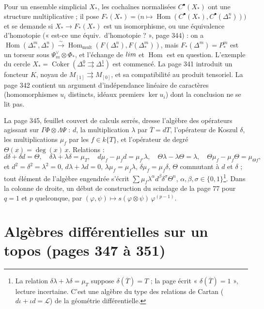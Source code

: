 \documentclass[11pt,a4paper]{article}
\begin{document}
Pour un ensemble simplicial $X_*$, les cochaînes normalisées $C^\bullet(X_*)$ ont
une structure multiplicative ; il pose $F_*(X_*) = \bigl(n \mapsto
\operatorname{Hom}(C^\bullet(X_*), C^\bullet(\Delta^n_*))\bigr)$ et se demande si
$X_* \to F_*(X_*)$ est un isomorphisme, ou une équivalence d'homotopie (« est-ce
une équiv.\ d'homotopie ? », page 344) : on a $\operatorname{Hom}(\Delta^m_*,
\Delta^n_*) \xrightarrow{\sim} \operatorname{Hom}_{\mathrm{mult}}(F(\Delta^n_*),
F(\Delta^m_*))$, mais $F_*(\Delta^m) = P^m_*$ est un torseur sous
$\Psi_m^\vee \otimes \Phi_*$, et l'échange de $\varprojlim$ et
$\operatorname{Hom}$ est en question. L'exemple du cercle $X_* =
\operatorname{Coker}(\Delta^0_* \rightrightarrows \Delta^1_*)$ est commencé. La
page 341 introduit un foncteur $K$, noyau de $M_{[1]} \rightrightarrows M_{[0]}$,
et sa compatibilité au produit tensoriel. La page 342 contient un argument
d'indépendance linéaire de caractères (homomorphismes $u_i$ distincts, idéaux
premiers $\ker u_i$) dont la conclusion ne se lit pas.

La page 345, feuillet couvert de calculs serrés, dresse l'algèbre des
opérateurs agissant sur $\Gamma\Phi \otimes \Lambda\Psi$ : $d$, la multiplication
$\lambda$ par $\overline{T} = dT$, l'opérateur de Koszul $\delta$, les
multiplications $\mu_f$ par les $f \in k\{T\}$, et l'opérateur de degré
$\Theta(x) = \deg(x)\,x$. Relations :
\[
d\delta + \delta d = \Theta, \quad \delta\lambda + \lambda\delta = \mu_T, \quad d\mu_f - \mu_fd = \mu_{f'}\lambda, \quad \Theta\lambda - \lambda\Theta = \lambda, \quad \Theta\mu_f - \mu_f\Theta = \mu_{\Theta f} ,
\]
et $d^2 = \delta^2 = \lambda^2 = 0$, $d\lambda + \lambda d = 0$, $\lambda\mu_f =
\mu_f\lambda$, $\delta\mu_f = \mu_f\delta$, $\Theta$ commutant à $d$ et
$\delta$ ; tout élément de l'algèbre engendrée s'écrit $\sum \mu_f
\lambda^\alpha d^\beta \delta^\sigma \Theta^n$, $\alpha, \beta, \sigma \in
\{0,1\}$\footnote{La relation $\delta\lambda + \lambda\delta = \mu_T$ suppose
$\delta(\overline{T}) = T$ ; la page écrit « $\delta(\overline{T}) = 1$ », lecture
incertaine. C'est une algèbre du type des relations de Cartan ($d\iota +
\iota d = \mathcal{L}$) de la géométrie différentielle.}. Dans la colonne de
droite, un début de construction du scindage de la page 77 pour $q = 1$ et $p$
quelconque, par $(\varphi, \psi) \mapsto s(\varphi \otimes \psi)\,
\varphi^{(p-1)}$.

\section*{Algèbres différentielles sur un topos (pages 347 à 351)}
\end{document}
